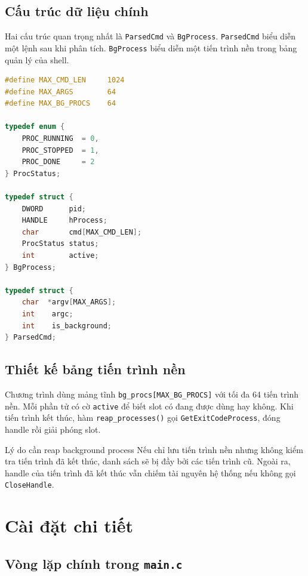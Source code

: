 \documentclass[13pt,a4paper,oneside]{extreport}
\begin{document}
\section{Cấu trúc dữ liệu chính}

Hai cấu trúc quan trọng nhất là \texttt{ParsedCmd} và \texttt{BgProcess}. \texttt{ParsedCmd} biểu diễn một lệnh sau khi phân tích. \texttt{BgProcess} biểu diễn một tiến trình nền trong bảng quản lý của shell.

\begin{lstlisting}[language=C,caption={Cấu trúc dữ liệu lệnh và tiến trình nền}]
#define MAX_CMD_LEN     1024
#define MAX_ARGS        64
#define MAX_BG_PROCS    64

typedef enum {
    PROC_RUNNING  = 0,
    PROC_STOPPED  = 1,
    PROC_DONE     = 2
} ProcStatus;

typedef struct {
    DWORD      pid;
    HANDLE     hProcess;
    char       cmd[MAX_CMD_LEN];
    ProcStatus status;
    int        active;
} BgProcess;

typedef struct {
    char  *argv[MAX_ARGS];
    int    argc;
    int    is_background;
} ParsedCmd;
\end{lstlisting}

\section{Thiết kế bảng tiến trình nền}

Chương trình dùng mảng tĩnh \texttt{bg\_procs[MAX\_BG\_PROCS]} với tối đa 64 tiến trình nền. Mỗi phần tử có cờ \texttt{active} để biết slot có đang được dùng hay không. Khi tiến trình kết thúc, hàm \texttt{reap\_processes()} gọi \texttt{GetExitCodeProcess}, đóng handle rồi giải phóng slot.

\begin{noteBox}{Lý do cần reap background process}
	Nếu chỉ lưu tiến trình nền nhưng không kiểm tra tiến trình đã kết thúc, danh sách sẽ bị đầy bởi các tiến trình cũ. Ngoài ra, handle của tiến trình đã kết thúc vẫn chiếm tài nguyên hệ thống nếu không gọi \texttt{CloseHandle}.
\end{noteBox}

\chapter{Cài đặt chi tiết}

\section{Vòng lặp chính trong \texttt{main.c}}
\end{document}
